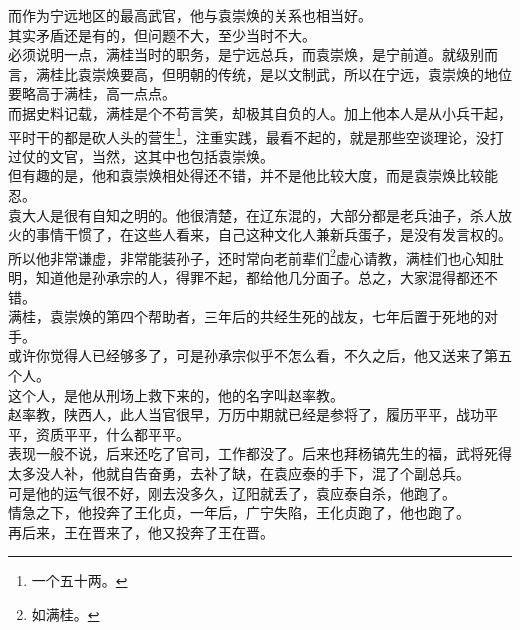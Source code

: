 \begin{multicols}{\theparacolNo}
而作为宁远地区的最高武官，他与袁崇焕的关系也相当好。\\

其实矛盾还是有的，但问题不大，至少当时不大。\\

必须说明一点，满桂当时的职务，是宁远总兵，而袁崇焕，是宁前道。就级别而言，满桂比袁崇焕要高，但明朝的传统，是以文制武，所以在宁远，袁崇焕的地位要略高于满桂，高一点点。\\

而据史料记载，满桂是个不苟言笑，却极其自负的人。加上他本人是从小兵干起，平时干的都是砍人头的营生\footnote{一个五十两。}，注重实践，最看不起的，就是那些空谈理论，没打过仗的文官，当然，这其中也包括袁崇焕。\\

但有趣的是，他和袁崇焕相处得还不错，并不是他比较大度，而是袁崇焕比较能忍。\\

袁大人是很有自知之明的。他很清楚，在辽东混的，大部分都是老兵油子，杀人放火的事情干惯了，在这些人看来，自己这种文化人兼新兵蛋子，是没有发言权的。\\

所以他非常谦虚，非常能装孙子，还时常向老前辈们\footnote{如满桂。}虚心请教，满桂们也心知肚明，知道他是孙承宗的人，得罪不起，都给他几分面子。总之，大家混得都还不错。\\

满桂，袁崇焕的第四个帮助者，三年后的共经生死的战友，七年后置于死地的对手。\\

或许你觉得人已经够多了，可是孙承宗似乎不怎么看，不久之后，他又送来了第五个人。\\

这个人，是他从刑场上救下来的，他的名字叫赵率教。\\

赵率教，陕西人，此人当官很早，万历中期就已经是参将了，履历平平，战功平平，资质平平，什么都平平。\\

表现一般不说，后来还吃了官司，工作都没了。后来也拜杨镐先生的福，武将死得太多没人补，他就自告奋勇，去补了缺，在袁应泰的手下，混了个副总兵。\\

可是他的运气很不好，刚去没多久，辽阳就丢了，袁应泰自杀，他跑了。\\

情急之下，他投奔了王化贞，一年后，广宁失陷，王化贞跑了，他也跑了。\\

再后来，王在晋来了，他又投奔了王在晋。\\


\end{multicols}

